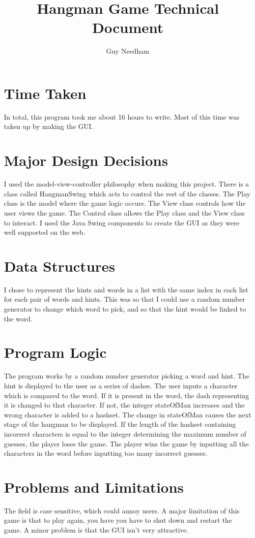 \documentclass[11pt]{article}
\begin{document}
\title{Hangman Game Technical Document}
\author{Guy Needham}
\maketitle

\section{Time Taken}
In total, this program took me about 16 hours to write. Most of this time was taken up by making the GUI.

\section{Major Design Decisions}
I used the model-view-controller philosophy when making this project. There is a class called HangmanSwing which acts to control the rest of the classes. The Play class is the model where the game logic occurs. The View class controls how the user views the game. The Control class allows the Play class and the View class to interact. I used the Java Swing components to create the GUI as they were well supported on the web.

\section{Data Structures}
I chose to represent the hints and words in a list with the same index in each list for each pair of words and hints. This was so that I could use a random number generator to change which word to pick, and so that the hint would be linked to the word.

\section{Program Logic}
The program works by a random number generator picking a word and hint. The hint is displayed to the user as a series of dashes. The user inputs a character which is compared to the word. If it is present in the word, the dash representing it is changed to that character. If not, the integer stateOfMan increases and the wrong character is added to a hashset. The change in stateOfMan causes the next stage of the hangman to be displayed. If the length of the hashset containing incorrect characters is equal to the integer determining the maximum number of guesses, the player loses the game. The player wins the game by inputting all the characters in the word before inputting too many incorrect guesses.

\section{Problems and Limitations}
The field is case sensitive, which could annoy users.
A major limitation of this game is that to play again, you have you have to shut down and restart the game.
A minor problem is that the GUI isn't very attractive.
\end{document}
